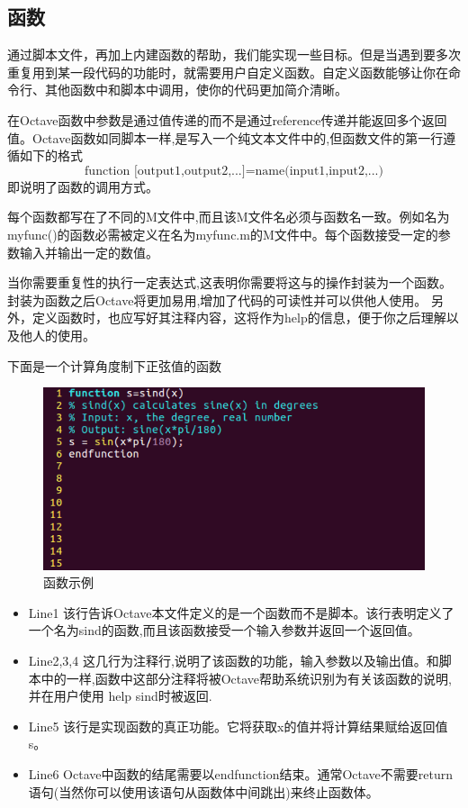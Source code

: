 \documentclass[a4paper,11pt]{ctexart}
\begin{document}
\subsection{函数}
通过脚本文件，再加上内建函数的帮助，我们能实现一些目标。但是当遇到要多次重复用到某一段代码的功能时，就需要用户自定义函数。自定义函数能够让你在命令行、其他函数中和脚本中调用，使你的代码更加简介清晰。\par
在Octave函数中参数是通过值传递的而不是通过reference传递并能返回多个返回值。Octave函数如同脚本一样,是写入一个纯文本文件中的,但函数文件的第一行遵循如下的格式
$$\text{function [output1,output2,...]=name(input1,input2,...)}$$
即说明了函数的调用方式。\par
每个函数都写在了不同的M文件中,而且该M文件名必须与函数名一致。例如名为myfunc()的函数必需被定义在名为myfunc.m的M文件中。每个函数接受一定的参数输入并输出一定的数值。\par
当你需要重复性的执行一定表达式,这表明你需要将这与的操作封装为一个函数。封装为函数之后Octave将更加易用,增加了代码的可读性并可以供他人使用。
另外，定义函数时，也应写好其注释内容，这将作为help的信息，便于你之后理解以及他人的使用。\par
下面是一个计算角度制下正弦值的函数
\begin{figure}[H]
	\begin{center}
		\includegraphics[width=.8\textwidth]{sind.png}
	\end{center}
	\caption{函数示例}
\end{figure}
\begin{itemize}
	\item Line1 该行告诉Octave本文件定义的是一个函数而不是脚本。该行表明定义了一个名为sind的函数,而且该函数接受一个输入参数并返回一个返回值。
	\item Line2,3,4 这几行为注释行,说明了该函数的功能，输入参数以及输出值。和脚本中的一样,函数中这部分注释将被Octave帮助系统识别为有关该函数的说明,并在用户使用 help sind时被返回.
	\item Line5 该行是实现函数的真正功能。它将获取x的值并将计算结果赋给返回值s。
	\item Line6 Octave中函数的结尾需要以endfunction结束。通常Octave不需要return语句(当然你可以使用该语句从函数体中间跳出)来终止函数体。
\end{itemize}
\end{document}

